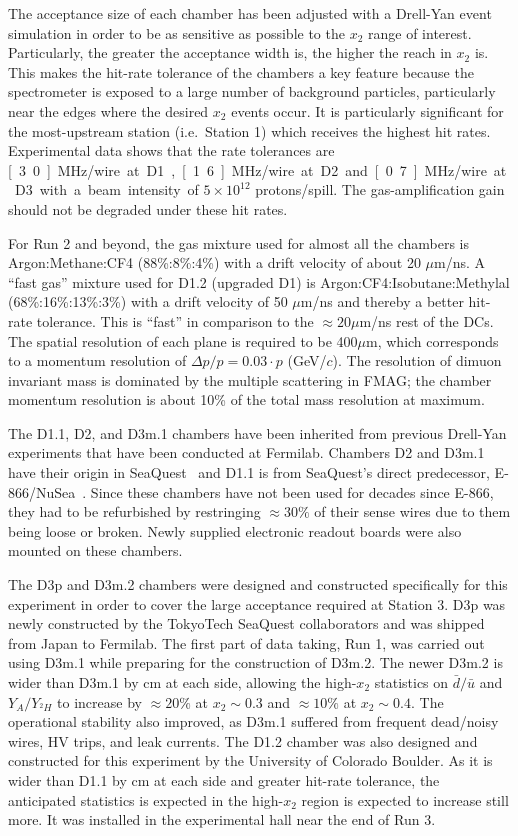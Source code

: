 The acceptance size of each chamber has been adjusted with a Drell-Yan event simulation in order to be as sensitive as possible to the $x_2$ range of interest. Particularly, the greater the acceptance width is, the higher the reach in $x_2$ is. This makes the hit-rate tolerance of the chambers a key feature because the spectrometer is exposed to a large number of background particles, particularly near the edges where the desired $x_2$ events occur. It is particularly significant for the most-upstream station (i.e.~Station 1) which receives the highest hit rates. Experimental data shows that the rate tolerances are \unit[3.0]{MHz/wire} at D1, \unit[1.6]{MHz/wire} at D2 and \unit[0.7]{MHz/wire} at D3 with a beam intensity of $5\times 10^{12}$ protons/spill. The gas-amplification gain should not be degraded under these hit rates.

For Run 2 and beyond, the gas mixture used for almost all the chambers is Argon:Methane:CF4 (88\%:8\%:4\%) with a drift velocity of about 20 $\mu$m/ns. A ``fast gas'' mixture used for D1.2 (upgraded D1) is Argon:CF4:Isobutane:Methylal (68\%:16\%:13\%:3\%) with a drift velocity of 50 $\mu$m/ns and thereby a better hit-rate tolerance. This is ``fast'' in comparison to the $\approx 20\mu$m/ns rest of the DCs. The spatial resolution of each plane is required to be 400$\mu$m, which corresponds to a momentum resolution of $\Delta p / p = 0.03 \cdot p$ (GeV/$c$). The resolution of dimuon invariant mass is dominated by the multiple scattering in FMAG; the chamber momentum resolution is about 10\% of the total mass resolution at maximum.

The D1.1, D2, and D3m.1 chambers have been inherited from previous Drell-Yan experiments that have been conducted at Fermilab.
Chambers D2 and D3m.1 have their origin in SeaQuest~\cite{PhysRevD.43.2815} and D1.1 is from SeaQuest's direct predecessor, E-866/NuSea~\cite{PhysRevLett.80.3715, Towell:2001nh}. Since these chambers have not been used for decades since E-866, they had to be refurbished by restringing $\approx 30\%$ of their sense wires due to them being loose or broken. Newly supplied electronic readout boards were also mounted on these chambers.

The D3p and D3m.2 chambers were designed and constructed specifically for this experiment in order to cover the large acceptance required at Station 3. D3p was newly constructed by the TokyoTech SeaQuest collaborators and was shipped from Japan to Fermilab. The first part of data taking, Run 1, was carried out using D3m.1 while preparing for the construction of D3m.2. The newer D3m.2 is wider than D3m.1 by \unit[25]{cm} at each side, allowing the high-$x_2$ statistics on $\bar{d}/\bar{u}$ and $Y_A / Y_{^2H}$ to increase by $\approx 20\%$ at $x_2 \sim 0.3$ and $\approx 10\%$ at $x_2 \sim 0.4$. The operational stability also improved, as D3m.1 suffered from frequent dead/noisy wires, HV trips, and leak currents. The D1.2 chamber was also designed and constructed for this experiment by the University of Colorado Boulder. As it is wider than D1.1 by \unit[25]{cm} at each side and greater hit-rate tolerance, the anticipated statistics is expected in the high-$x_2$ region is expected to increase still more. It was installed in the experimental hall near the end of Run 3.

